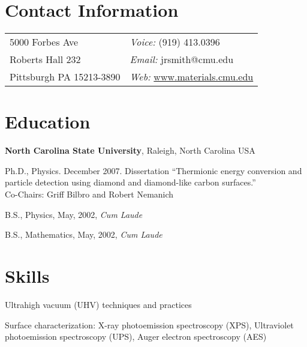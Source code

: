 \documentclass[letterpaper,margin,line]{res}
\newenvironment{list1}{
  \begin{list}{\ding{113}}{%
      \setlength{\itemsep}{0in}
      \setlength{\parsep}{0in} \setlength{\parskip}{0in}
      \setlength{\topsep}{0in} \setlength{\partopsep}{0in} 
      \setlength{\leftmargin}{0.17in}}}{\end{list}}
\begin{document}

\begin{resume}
\section{\sc Contact Information}
\vspace{.05in}
\begin{tabular}{@{}p{2in}p{4in}}
5000 Forbes Ave 		& {\it Voice:} (919) 413.0396\\
Roberts Hall 232        	& {\it Email:} {jrsmith@cmu.edu} \\
Pittsburgh PA 15213-3890	& {\it Web:} \href{http://www.materials.cmu.edu}{www.materials.cmu.edu}
\end{tabular}


\section{\sc Education}

{\bf North Carolina State University}, Raleigh, North Carolina USA\\
\vspace*{-.1in}
\begin{list1}
\item[] Ph.D., Physics. December 2007. Dissertation ``Thermionic energy conversion and particle detection using diamond and diamond-like carbon surfaces.'' \\Co-Chairs: Griff Bilbro and Robert Nemanich
\item[] B.S., Physics,  May, 2002, \textit{Cum Laude}
\item[] B.S., Mathematics, May, 2002, \textit{Cum Laude}
\end{list1}



\section{\sc Skills} 
Ultrahigh vacuum (UHV) techniques and practices

\vspace*{-2.5mm}
Surface characterization: X-ray photoemission spectroscopy (XPS), Ultraviolet photoemission spectroscopy (UPS), Auger electron spectroscopy (AES)


\end{resume}
\end{document}
